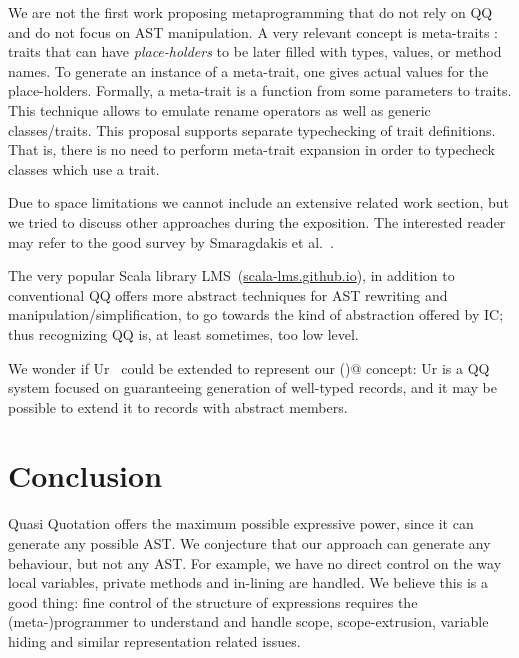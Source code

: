 We are not the first work proposing metaprogramming that do not rely on QQ and do not
focus on AST manipulation.
A very relevant concept is meta-traits \cite{reppy2007metaprogramming}:
 traits that can have \emph{place-holders} to be later filled with types, 
values, or method names.
To generate an instance of a meta-trait, one 
gives actual values for the place-holders. 
Formally, a meta-trait is a function from some parameters to traits.
This technique allows to emulate rename operators as well as generic classes/traits.
This proposal supports separate typechecking of trait definitions. That is, there is no need to perform meta-trait expansion
 in order to typecheck classes which use a trait.



Due to space limitations we cannot include an extensive related work section,
but we tried to discuss other approaches during the exposition.
The interested reader may refer to the good survey by Smaragdakis et al.~\cite{smaragdakis2015structured}.

The very popular Scala library LMS~(\url{scala-lms.github.io}), in addition to conventional QQ offers
more abstract techniques for AST rewriting and manipulation/simplification,
to go towards the kind of abstraction offered by IC;
thus recognizing QQ is, at least sometimes, too low level.

We wonder if Ur~\cite{chlipala2010ur} could be extended to represent our \Q@inductive()@ concept:
Ur is a QQ system focused on guaranteeing generation of well-typed records,
and it may be possible to extend it to records with abstract members.


\section{Conclusion}


Quasi Quotation offers the maximum possible expressive power, since it can generate any possible AST.
We conjecture that our approach can generate any behaviour, but not any AST.
For example, we have no direct control on the way local variables, private methods 
and in-lining are handled.
We believe this is a good thing: fine control of the structure of expressions requires
the (meta-)programmer to understand and handle scope, scope-extrusion, variable hiding and similar
representation related issues.


